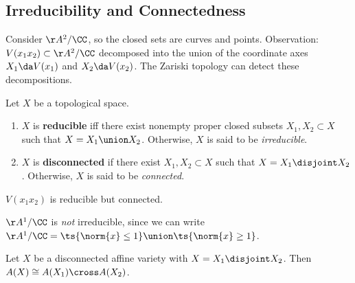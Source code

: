 \hypertarget{irreducibility-and-connectedness}{%
\subsection{Irreducibility and
Connectedness}\label{irreducibility-and-connectedness}}

\begin{example}

Consider \(\AA^2/\CC\), so the closed sets are curves and points.
Observation: \(V(x_1 x_2 ) \subset \AA^2/\CC\) decomposed into the union
of the coordinate axes \(X_1 \da V(x_1)\) and \(X_2 \da V(x_2)\). The
Zariski topology can detect these decompositions.

\end{example}

\begin{definition}

Let \(X\) be a topological space.

\begin{enumerate}
\def\labelenumi{\alph{enumi}.}
\item
  \(X\) is \textbf{reducible} iff there exist nonempty proper closed
  subsets \(X_1 ,X_2 \subset X\) such that \(X = X_1 \union X_2\).
  Otherwise, \(X\) is said to be \emph{irreducible}.
\item
  \(X\) is \textbf{disconnected} if there exist \(X_1, X_2 \subset X\)
  such that \(X = X_1 \disjoint X_2\). Otherwise, \(X\) is said to be
  \emph{connected}.
\end{enumerate}

\end{definition}

\begin{example}

\(V(x_1 x_2)\) is reducible but connected.

\end{example}

\begin{remark}

\(\AA^1/\CC\) is \emph{not} irreducible, since we can write
\(\AA^1/\CC = \ts{\norm{x} \leq 1} \union \ts{\norm{x} \geq 1}\).

\end{remark}

\begin{proposition}[?]

Let \(X\) be a disconnected affine variety with
\(X = X_1 \disjoint X_2\). Then \(A(X) \cong A(X_1) \cross A(X_2)\).

\end{proposition}

